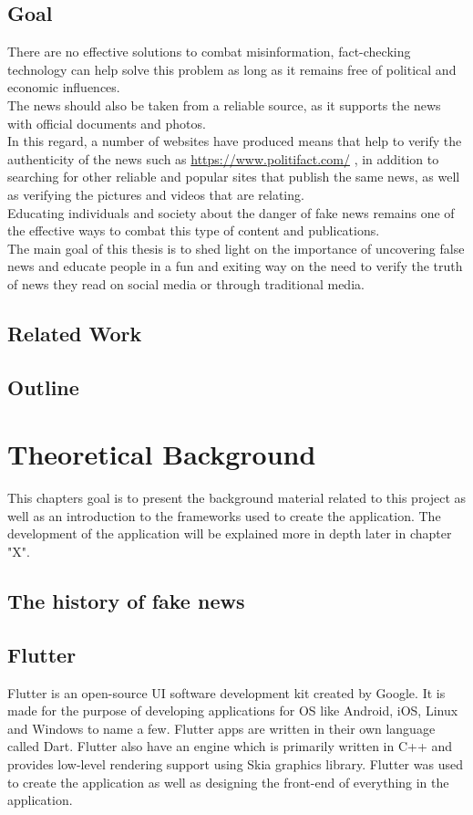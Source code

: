 \documentclass[12pt, letterpaper, twoside]{article}
\begin{document}
\subsection{Goal}
There are no effective solutions to combat misinformation, fact-checking technology can help solve this problem as long as it remains free of political and economic influences.\\
The news should also be taken from a reliable source, as it supports the news with official documents and photos.\\
In this regard, a number of websites have produced means that help to verify the authenticity of the news such as \url{https://www.politifact.com/} , in addition to searching for other reliable and popular sites that publish the same news, as well as verifying the pictures and videos that are relating.\\
Educating individuals and society about the danger of fake news remains one of the effective ways to combat this type of content and publications.\\
The main goal of this thesis is to shed light on the importance of uncovering false news and educate people in a fun and exiting way on the need to verify the truth of news they read on social media or through traditional media.\\
\subsection{Related Work}
\subsection{Outline}

\section{Theoretical Background}
This chapters goal is to present the background material related to this project as well as an introduction to the frameworks used to create the application. The development of the application will be explained more in depth later in chapter "X". 
\subsection{The history of fake news}
\subsection{Flutter}
Flutter is an open-source UI software development kit created by Google. It is made for the purpose of developing applications for OS like Android, iOS, Linux and Windows to name a few. Flutter apps are written in their own language called Dart. Flutter also have an engine which is primarily written in C++ and provides low-level rendering support using Skia graphics library. Flutter was used to create the application as well as designing the front-end of everything in the application. \\
\end{document}
